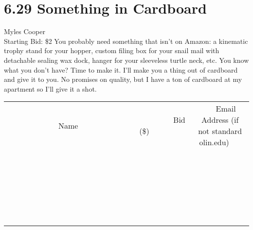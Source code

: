 \documentclass[11pt]{article}
\begin{document}
\section*{6.29 Something in Cardboard}
Myles Cooper
\\
Starting Bid: \$2
\newline
You probably need something that isn't on Amazon: a kinematic trophy stand for your hopper, custom filing box for your snail mail with detachable sealing wax dock, hanger for your sleeveless turtle neck, etc. You know what you don't have? Time to make it. I'll make you a thing out of cardboard and give it to you. No promises on quality, but I have a ton of cardboard at my apartment so I'll give it a shot.
\\[6ex]
\begin{tabular}{c c c}
~~~~~~~~~~~~~Name~~~~~~~~~~~~~ & ~~~~~~~~~Bid (\$)~~~~~~~~~  & ~~~Email Address (if not standard olin.edu)~~~\\
 & & \\
\hline
 & & \\
\hline
 & & \\
\hline
 & & \\
\hline
 & & \\
\hline
 & & \\
\hline
 & & \\
\hline
 & & \\
\hline
 & & \\
\hline
 & & \\
\hline
 & & \\
\hline
 & & \\
\hline
 & & \\
\hline
 & & \\
\hline
 & & \\
\hline
 & & \\
\hline
 & & \\
\hline
 & & \\
\hline
 & & \\
\hline
 & & \\
\hline
 & & \\
\hline
 & & \\
\hline
 & & \\
\hline
 & & \\
\hline
 & & \\
\hline
 & & \\
\hline
\end{tabular}
\newpage
\end{document}
